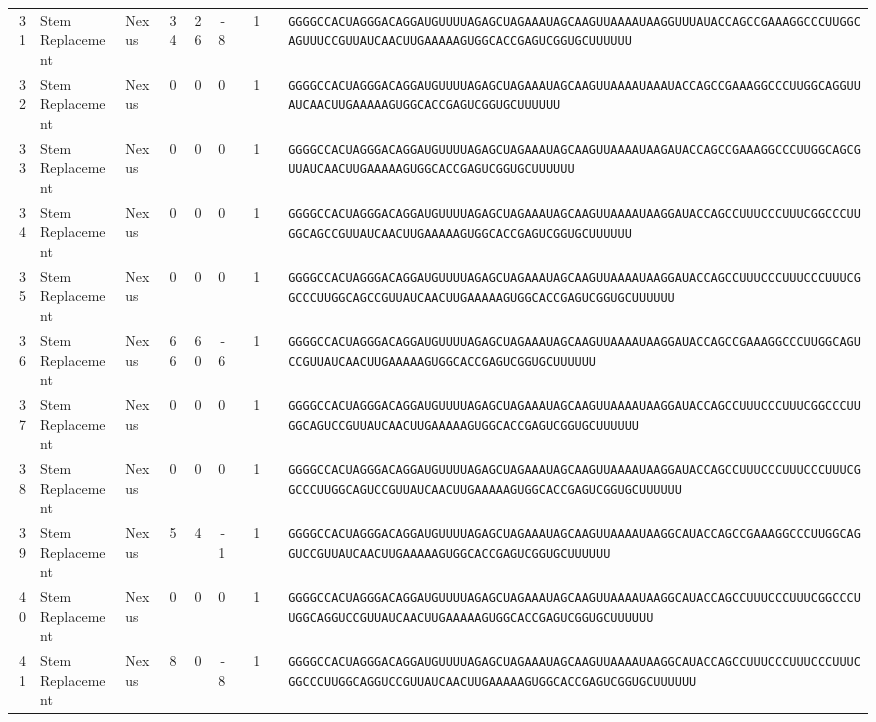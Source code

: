 \begin{tabular}{rllrrrrrcl}
 31 &
 Stem Replacement &
 Nexus &
 34 &
 26 &
 -8 &
  &
 1 &
  &
 \verb|GGGGCCACUAGGGACAGGAUGUUUUAGAGCUAGAAAUAGCAAGUUAAAAUAAGGUUUAUACCAGCCGAAAGGCCCUUGGCAGUUUCCGUUAUCAACUUGAAAAAGUGGCACCGAGUCGGUGCUUUUUU| \\
 32 &
 Stem Replacement &
 Nexus &
 0 &
 0 &
 0 &
  &
 1 &
  &
 \verb|GGGGCCACUAGGGACAGGAUGUUUUAGAGCUAGAAAUAGCAAGUUAAAAUAAAUACCAGCCGAAAGGCCCUUGGCAGGUUAUCAACUUGAAAAAGUGGCACCGAGUCGGUGCUUUUUU| \\
 33 &
 Stem Replacement &
 Nexus &
 0 &
 0 &
 0 &
  &
 1 &
  &
 \verb|GGGGCCACUAGGGACAGGAUGUUUUAGAGCUAGAAAUAGCAAGUUAAAAUAAGAUACCAGCCGAAAGGCCCUUGGCAGCGUUAUCAACUUGAAAAAGUGGCACCGAGUCGGUGCUUUUUU| \\
 34 &
 Stem Replacement &
 Nexus &
 0 &
 0 &
 0 &
  &
 1 &
  &
 \verb|GGGGCCACUAGGGACAGGAUGUUUUAGAGCUAGAAAUAGCAAGUUAAAAUAAGGAUACCAGCCUUUCCCUUUCGGCCCUUGGCAGCCGUUAUCAACUUGAAAAAGUGGCACCGAGUCGGUGCUUUUUU| \\
 35 &
 Stem Replacement &
 Nexus &
 0 &
 0 &
 0 &
  &
 1 &
  &
 \verb|GGGGCCACUAGGGACAGGAUGUUUUAGAGCUAGAAAUAGCAAGUUAAAAUAAGGAUACCAGCCUUUCCCUUUCCCUUUCGGCCCUUGGCAGCCGUUAUCAACUUGAAAAAGUGGCACCGAGUCGGUGCUUUUUU| \\
 36 &
 Stem Replacement &
 Nexus &
 66 &
 60 &
 -6 &
  &
 1 &
  &
 \verb|GGGGCCACUAGGGACAGGAUGUUUUAGAGCUAGAAAUAGCAAGUUAAAAUAAGGAUACCAGCCGAAAGGCCCUUGGCAGUCCGUUAUCAACUUGAAAAAGUGGCACCGAGUCGGUGCUUUUUU| \\
 37 &
 Stem Replacement &
 Nexus &
 0 &
 0 &
 0 &
  &
 1 &
  &
 \verb|GGGGCCACUAGGGACAGGAUGUUUUAGAGCUAGAAAUAGCAAGUUAAAAUAAGGAUACCAGCCUUUCCCUUUCGGCCCUUGGCAGUCCGUUAUCAACUUGAAAAAGUGGCACCGAGUCGGUGCUUUUUU| \\
 38 &
 Stem Replacement &
 Nexus &
 0 &
 0 &
 0 &
  &
 1 &
  &
 \verb|GGGGCCACUAGGGACAGGAUGUUUUAGAGCUAGAAAUAGCAAGUUAAAAUAAGGAUACCAGCCUUUCCCUUUCCCUUUCGGCCCUUGGCAGUCCGUUAUCAACUUGAAAAAGUGGCACCGAGUCGGUGCUUUUUU| \\
 39 &
 Stem Replacement &
 Nexus &
 5 &
 4 &
 -1 &
  &
 1 &
  &
 \verb|GGGGCCACUAGGGACAGGAUGUUUUAGAGCUAGAAAUAGCAAGUUAAAAUAAGGCAUACCAGCCGAAAGGCCCUUGGCAGGUCCGUUAUCAACUUGAAAAAGUGGCACCGAGUCGGUGCUUUUUU| \\
 40 &
 Stem Replacement &
 Nexus &
 0 &
 0 &
 0 &
  &
 1 &
  &
 \verb|GGGGCCACUAGGGACAGGAUGUUUUAGAGCUAGAAAUAGCAAGUUAAAAUAAGGCAUACCAGCCUUUCCCUUUCGGCCCUUGGCAGGUCCGUUAUCAACUUGAAAAAGUGGCACCGAGUCGGUGCUUUUUU| \\
 41 &
 Stem Replacement &
 Nexus &
 8 &
 0 &
 -8 &
  &
 1 &
  &
 \verb|GGGGCCACUAGGGACAGGAUGUUUUAGAGCUAGAAAUAGCAAGUUAAAAUAAGGCAUACCAGCCUUUCCCUUUCCCUUUCGGCCCUUGGCAGGUCCGUUAUCAACUUGAAAAAGUGGCACCGAGUCGGUGCUUUUUU| \\

\end{tabular}
